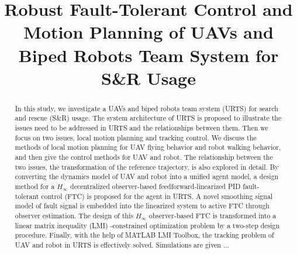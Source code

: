 \documentclass{ieeeaccess}
\begin{document}


\title{Robust Fault-Tolerant Control and Motion Planning of UAVs and Biped Robots Team System for S\&R Usage}



\begin{abstract}
In this study, we investigate a UAVs and biped robots team system (URTS) for search and rescue (S\&R) usage. The system architecture of URTS is proposed to illustrate the issues need to be addressed in URTS and the relationships between them. Then we focus on two issues, local motion planning and tracking control. We discuss the methods of local motion planning for UAV flying behavior and robot walking behavior, and then give the control methods for UAV and robot. The relationship between the two issues, the transformation of the reference trajectory, is also explored in detail. By converting the dynamics model of UAV and robot into a unified agent model, a design method for a $H_\infty$ decentralized observer-based feedforward-linearized PID fault-tolerant control (FTC) is proposed for the agent in URTS. A novel smoothing signal model of fault signal is embedded into the linearized system to active FTC through observer estimation. The design of this $H_\infty$ observer-based FTC is transformed into a linear matrix inequality (LMI) -constrained optimization problem by a two-step design procedure. Finally, with the help of MATLAB LMI Toolbox, the tracking problem of UAV and robot in URTS is effectively solved. Simulations are given ...
\end{abstract}
\end{document}
